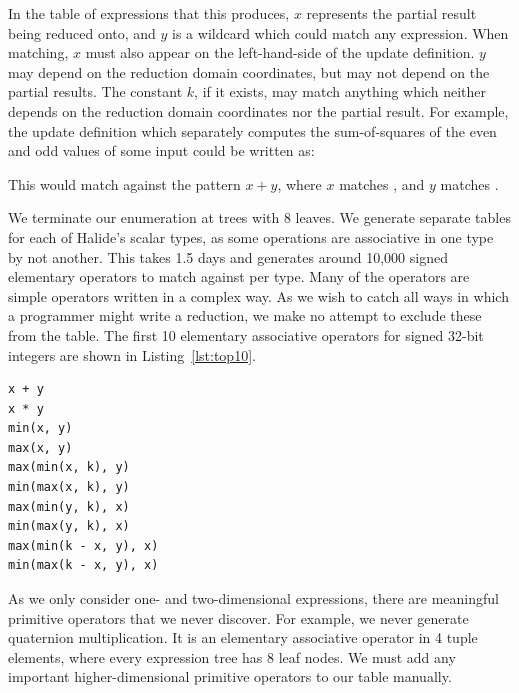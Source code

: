 In the table of expressions that this produces, $x$ represents the partial result being reduced onto, and $y$ is a wildcard which could match any expression. When matching, $x$ must also appear on the left-hand-side of the update definition. $y$ may depend on the reduction domain coordinates, but may not depend on the partial results. The constant $k$, if it exists, may match anything which neither depends on the reduction domain coordinates nor the partial result. For example, the update definition which separately computes the sum-of-squares of the even and odd values of some input  could be written as:


This would match against the pattern $x + y$, where $x$ matches , and $y$ matches .

We terminate our enumeration at trees with 8 leaves. We generate separate tables for each of Halide's scalar types, as some operations are associative in one type by not another. This takes 1.5 days and generates around 10,000 signed elementary operators to match against per type. Many of the operators are simple operators written in a complex way. As we wish to catch all ways in which a programmer might write a reduction, we make no attempt to exclude these from the table. The first 10 elementary associative operators for signed 32-bit integers are shown in Listing~\ref{lst:top10}.

\begin{lstlisting}[caption={The first 10 elementary associative operators for 32-bit signed integers}, label={lst:top10}]
x + y
x * y
min(x, y)
max(x, y)
max(min(x, k), y)
min(max(x, k), y)
max(min(y, k), x)
min(max(y, k), x)
max(min(k - x, y), x)
min(max(k - x, y), x)
\end{lstlisting}


As we only consider one- and two-dimensional expressions, there are meaningful primitive operators that we never discover. For example, we never generate quaternion multiplication. It is an elementary associative operator in 4 tuple elements, where every expression tree has 8 leaf nodes. We must add any important higher-dimensional primitive operators to our table manually.


